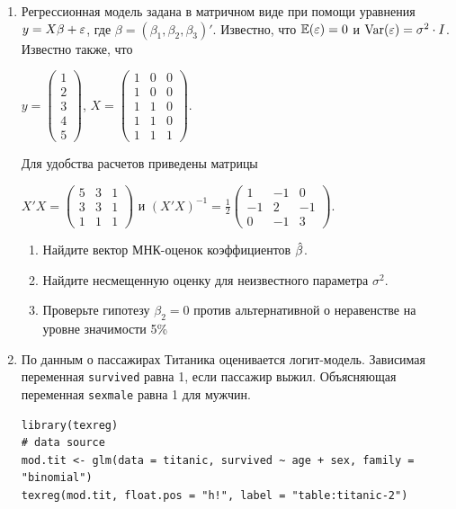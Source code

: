 \documentclass[12pt, a4paper]{article}
\begin{document}
\begin{enumerate}
\item Регрессионная модель  задана в матричном виде при помощи уравнения $y=X\beta+\varepsilon$, где $\beta=(\beta_1,\beta_2,\beta_3)'$.
Известно, что $\mathbb{E}(\varepsilon)=0$  и  $\operatorname{Var}(\varepsilon)=\sigma^2\cdot I$.
Известно также, что

$y=\left(
\begin{array}{c}
1\\
2\\
3\\
4\\
5
\end{array}\right)$,
$X=\left(\begin{array}{ccc}
1 & 0 & 0 \\
1 & 0 & 0 \\
1 & 1 & 0 \\
1 & 1 & 0 \\
1 & 1 & 1
\end{array}\right)$.


Для удобства расчетов приведены матрицы


$X'X=\left(
\begin{array}{ccc}
5 & 3 & 1\\
3 & 3 & 1\\
1 & 1 & 1
\end{array}\right)$ и $(X'X)^{-1}=\frac{1}{2}\left(
\begin{array}{ccc}
1 & -1 & 0 \\
-1 & 2 & -1 \\
0 & -1 & 3
\end{array}\right)$.

\begin{enumerate}
\item Найдите вектор МНК-оценок коэффициентов $\hat{\beta}$.
\item Найдите несмещенную оценку для неизвестного параметра $\sigma^2$.
\item Проверьте гипотезу $\beta_2=0$ против альтернативной о неравенстве на уровне значимости 5\%

\end{enumerate}




\item По данным о пассажирах Титаника оценивается логит-модель. Зависимая переменная \verb|survived| равна 1, если пассажир выжил. Объясняющая переменная \verb|sexmale| равна 1 для  мужчин.

\begin{verbatim}
library(texreg)
# data source
mod.tit <- glm(data = titanic, survived ~ age + sex, family = "binomial")
texreg(mod.tit, float.pos = "h!", label = "table:titanic-2")
\end{verbatim}


\end{enumerate}
\end{document}
